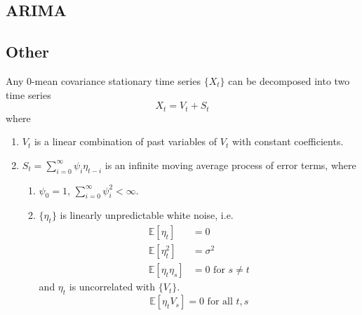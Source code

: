 \documentclass{article}
\begin{document}
\subsection{ARIMA}

\subsection{Other}

  \begin{theorem}
    Any $0$-mean covariance stationary time series $\{X_t\}$ can be decomposed into two time series 
    \begin{equation}
      X_t = V_t + S_t
    \end{equation}
    where 
    \begin{enumerate}
      \item $V_t$ is a linear combination of past variables of $V_t$ with constant coefficients. 
      \item $S_t = \sum_{i=0}^\infty \psi_i \eta_{t-i}$ is an infinite moving average process of error terms, where 
        \begin{enumerate}
          \item $\psi_0 = 1$, $\sum_{i=0}^\infty \psi_i^2 < \infty$. 
          \item $\{\eta_t\}$ is linearly unpredictable white noise, i.e. 
            \begin{align}
              \mathbb{E}[\eta_t] & = 0 \\
              \mathbb{E}[\eta_t^2] & = \sigma^2 \\
              \mathbb{E}[\eta_t \eta_s] & = 0 \text{ for } s \neq t 
            \end{align}
            and $\eta_t$ is uncorrelated with $\{V_t\}$.  
            \begin{equation}
              \mathbb{E}[\eta_t V_s] = 0 \text{ for all } t, s
            \end{equation}
        \end{enumerate}
    \end{enumerate}
  \end{theorem}
\end{document}
